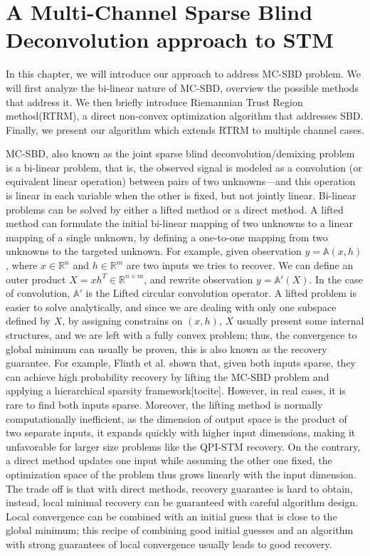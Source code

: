 \section{A Multi-Channel Sparse Blind Deconvolution approach to STM}

In this chapter, we will introduce our approach to address \ac{MC-SBD} problem. We will first analyze the bi-linear nature of \ac{MC-SBD}, overview the possible methods that address it. We then briefly introduce Riemannian Trust Region method(RTRM), a direct non-convex optimization algorithm that addresses \ac{SBD}. Finally, we present our algorithm which extends \ac{RTRM} to multiple channel cases. 

\ac{MC-SBD}, also known as the joint sparse blind deconvolution/demixing problem is a bi-linear problem, that is, the observed signal is modeled as a convolution (or equivalent linear operation) between pairs of two unknowns—and this operation is linear in each variable when the other is fixed, but not jointly linear. Bi-linear problems can be solved by either a lifted method or a direct method. A lifted method can formulate the initial bi-linear mapping of two unknowns to a linear mapping of a single unknown, by defining a one-to-one mapping from two unknowns to the targeted unknown. For example, given observation $y = \mathbb{A}(x,h)$, where $x \in \mathbb{R}^n$ and $h \in \mathbb{R}^m$ are two inputs we tries to recover. We can define an outer product $X = xh^T\in \mathbb{R}^{n\times m}$, and rewrite observation $y = \mathbb{A'}(X)$. In the case of convolution, $\mathbb{A'}$ is the Lifted circular convolution operator. A lifted problem is easier to solve analytically, and since we are dealing with only one subspace defined by $X$, by assigning constrains on $(x,h)$,  $X$ usually present some internal structures, and we are left with a fully convex problem; thus, the convergence to global minimum can usually be proven, this is also known as the recovery guarantee. For example, Flinth et al. shown that, given both inputs sparse, they can achieve high probability recovery by lifting the \ac{MC-SBD} problem and applying a hierarchical sparsity framework[tocite]. However, in real cases, it is rare to find both inputs sparse. Moreover, the lifting method is normally computationally inefficient, as the dimension of output space is the product of two separate inputs, it expands quickly with higher input dimensions, making it unfavorable for larger size problems like the QPI-STM recovery. On the contrary, a direct method updates one input while assuming the other one fixed, the optimization space of the problem thus grows linearly with the input dimension. The trade off is that with direct methods, recovery guarantee is hard to obtain, instead, local minimal recovery can be guaranteed with careful algorithm design. Local convergence can be combined with an initial guess that is close to the global minimum; this recipe of combining good initial guesses and an algorithm with strong guarantees of local convergence usually leads to good recovery. 

